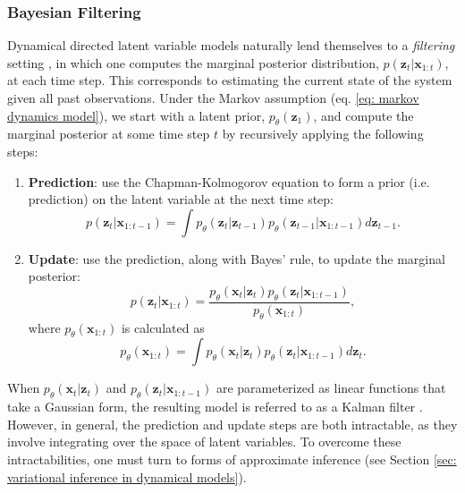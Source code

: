 \subsubsection{Bayesian Filtering}

Dynamical directed latent variable models naturally lend themselves to a \textit{filtering} setting \cite{sarkka2013bayesian}, in which one computes the marginal posterior distribution, $p(\mathbf{z}_t | \mathbf{x}_{1:t})$, at each time step. This corresponds to estimating the current state of the system given all past observations. Under the Markov assumption (eq. \ref{eq: markov dynamics model}), we start with a latent prior, $p_\theta (\mathbf{z}_1)$, and compute the marginal posterior at some time step $t$ by recursively applying the following steps:
\begin{enumerate}
	\item \textbf{Prediction}: use the Chapman-Kolmogorov equation to form a prior (i.e. prediction) on the latent variable at the next time step: 
\begin{equation}
	p(\mathbf{z}_t | \mathbf{x}_{1:t-1}) = \int p_\theta (\mathbf{z}_t | \mathbf{z}_{t-1}) p_\theta (\mathbf{z}_{t-1} | \mathbf{x}_{1:t-1}) d\mathbf{z}_{t-1}.
\end{equation}
	\item \textbf{Update}: use the prediction, along with Bayes' rule, to update the marginal posterior:
\begin{equation}
	p(\mathbf{z}_t | \mathbf{x}_{1:t}) = \frac{p_\theta (\mathbf{x}_t | \mathbf{z}_t) p_\theta (\mathbf{z}_t | \mathbf{x}_{1:t-1})}{p_\theta (\mathbf{x}_{1:t})},
\end{equation}
	where $p_\theta (\mathbf{x}_{1:t})$ is calculated as
\begin{equation}
	p_\theta (\mathbf{x}_{1:t}) = \int p_\theta (\mathbf{x}_t | \mathbf{z}_t) p_\theta (\mathbf{z}_t | \mathbf{x}_{1:t-1}) d\mathbf{z}_t.
\end{equation}
\end{enumerate}
When $p_\theta (\mathbf{x}_t | \mathbf{z}_t)$ and $p_\theta (\mathbf{z}_t | \mathbf{x}_{1:t-1})$ are parameterized as linear functions that take a Gaussian form, the resulting model is referred to as a Kalman filter \cite{kalman1961new}. However, in general, the prediction and update steps are both intractable, as they involve integrating over the space of latent variables. To overcome these intractabilities, one must turn to forms of approximate inference (see Section \ref{sec: variational inference in dynamical models}).

